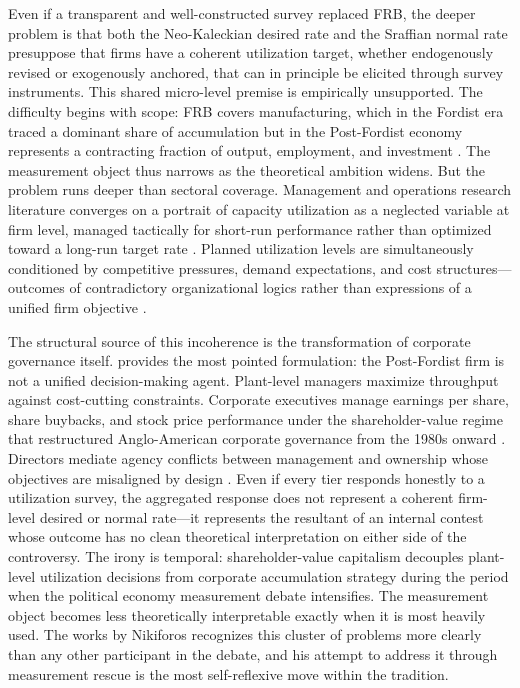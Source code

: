 \documentclass[11pt,a4paper]{article}
\begin{document}
Even if a transparent and well-constructed survey replaced FRB, the deeper problem is that both the Neo-Kaleckian desired rate and the Sraffian normal rate presuppose that firms have a coherent utilization
target, whether endogenously revised or exogenously anchored, that can in principle be elicited through survey instruments. This shared micro-level premise is empirically unsupported. The difficulty begins with scope: FRB covers manufacturing, which in the Fordist era traced a dominant share of accumulation but in the Post-Fordist economy
represents a contracting fraction of output, employment, and investment  \citep{Haluska2023}. The measurement object thus narrows as the theoretical ambition widens. But the problem runs deeper than sectoral coverage. Management and operations research literature converges on a portrait of capacity utilization as a neglected variable at firm level,
managed tactically for short-run performance rather than optimized toward a long-run target rate \citep{Anderson2001,Singh2022}. Planned utilization levels are simultaneously conditioned by competitive
pressures, demand expectations, and cost structures---outcomes of contradictory organizational logics rather than expressions of a unified firm objective \citep{Lieberman1989}.

The structural source of this incoherence is the transformation of corporate governance itself. \citet{vidal2022} provides the most pointed formulation: the Post-Fordist firm is not a unified decision-making agent. Plant-level managers maximize throughput against cost-cutting constraints. Corporate executives manage earnings per
share, share buybacks, and stock price performance under the shareholder-value regime that restructured Anglo-American corporate governance from the 1980s onward \citep{Lazonick2000}. Directors mediate agency conflicts between management and ownership whose objectives are misaligned by design \citep{Fligstein2015}. Even if
every tier responds honestly to a utilization survey, the aggregated response does not represent a coherent firm-level desired or normal rate---it represents the resultant of an internal contest whose outcome
has no clean theoretical interpretation on either side of the controversy. The irony is temporal: shareholder-value capitalism decouples plant-level utilization decisions from corporate accumulation strategy during the period when the political economy measurement debate intensifies. The measurement object becomes less theoretically interpretable exactly when it is most heavily used. The works by Nikiforos recognizes this cluster of problems more clearly than any other participant in the debate, and his attempt to address it through measurement rescue is the most self-reflexive move within the tradition.
\end{document}
